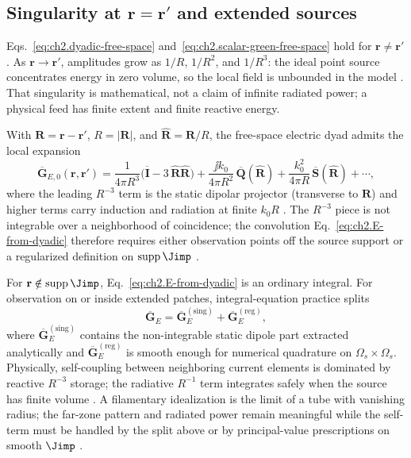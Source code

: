 \subsection[Singularity at \texorpdfstring{$\mathbf{r}=\mathbf{r}'$}{r=r'} and extended sources]{Singularity at $\mathbf{r}=\mathbf{r}'$ and extended sources}
\label{sec:ch02.4.3}

Eqs.~\eqref{eq:ch2.dyadic-free-space} and~\eqref{eq:ch2.scalar-green-free-space} hold for $\mathbf{r}\neq\mathbf{r}'$. As $\mathbf{r}\to\mathbf{r}'$, amplitudes grow as $1/R$, $1/R^2$, and $1/R^3$: the ideal point source concentrates energy in zero volume, so the local field is unbounded in the model \cite{stratton1941,jackson1999}. That singularity is mathematical, not a claim of infinite radiated power; a physical feed has finite extent and finite reactive energy.

With $\mathbf{R}=\mathbf{r}-\mathbf{r}'$, $R=|\mathbf{R}|$, and $\widehat{\mathbf{R}}=\mathbf{R}/R$, the free-space electric dyad admits the local expansion \cite{harrington2001,stratton1941}
\begin{equation}
\label{eq:ch2.dyadic-singular-expansion}
\overline{\mathbf{G}}_{E,0}(\mathbf{r},\mathbf{r}')
=
\frac{1}{4\pi R^{3}}\Big(\overline{\mathbf{I}}-3\,\widehat{\mathbf{R}}\widehat{\mathbf{R}}\Big)
+
\frac{\jj k_0}{4\pi R^{2}}\,\overline{\mathbf{Q}}(\widehat{\mathbf{R}})
+
\frac{k_0^{2}}{4\pi R}\,\overline{\mathbf{S}}(\widehat{\mathbf{R}})
+\cdots,
\end{equation}
where the leading $R^{-3}$ term is the static dipolar projector (transverse to $\mathbf{R}$) and higher terms carry induction and radiation at finite $k_0 R$ \cite{jackson1999}. The $R^{-3}$ piece is not integrable over a neighborhood of coincidence; the convolution Eq.~\eqref{eq:ch2.E-from-dyadic} therefore requires either observation points off the source support or a regularized definition on $\operatorname{supp}\Jimp$ \cite{stratton1941,harrington2001}.

For $\mathbf{r}\notin\operatorname{supp}\Jimp$, Eq.~\eqref{eq:ch2.E-from-dyadic} is an ordinary integral. For observation on or inside extended patches, integral-equation practice splits \cite{harrington2001}
\begin{equation}
\label{eq:ch2.kernel-singular-regular-split}
\overline{\mathbf{G}}_{E}
=
\overline{\mathbf{G}}_{E}^{\mathrm{(sing)}}
+\overline{\mathbf{G}}_{E}^{\mathrm{(reg)}},
\end{equation}
where $\overline{\mathbf{G}}_{E}^{\mathrm{(sing)}}$ contains the non-integrable static dipole part extracted analytically and $\overline{\mathbf{G}}_{E}^{\mathrm{(reg)}}$ is smooth enough for numerical quadrature on $\Omega_s\times\Omega_s$. Physically, self-coupling between neighboring current elements is dominated by reactive $R^{-3}$ storage; the radiative $R^{-1}$ term integrates safely when the source has finite volume \cite{stratton1941}. A filamentary idealization is the limit of a tube with vanishing radius; the far-zone pattern and radiated power remain meaningful while the self-term must be handled by the split above or by principal-value prescriptions on smooth $\Jimp$ \cite{jackson1999,harrington2001}.

